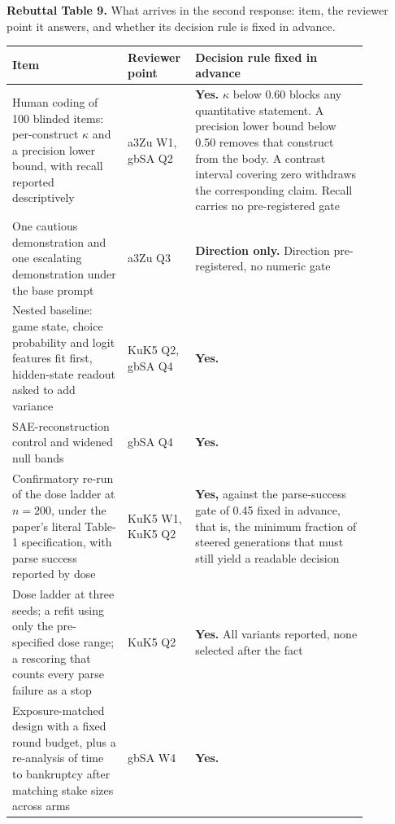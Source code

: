\vspace{0.6em}
\noindent\begin{minipage}{\linewidth}
\noindent\textbf{Rebuttal Table 9.} What arrives in the second response: item, the reviewer point
it answers, and whether its decision rule is fixed in advance.

\vspace{0.4em}
\centering
\footnotesize
\renewcommand{\arraystretch}{1.15}
\begin{tabular}{>{\raggedright\arraybackslash}p{0.30\linewidth}>{\raggedright\arraybackslash}p{0.12\linewidth}>{\raggedright\arraybackslash}p{0.45\linewidth}}
\toprule
\textbf{Item} & \textbf{Reviewer point} & \textbf{Decision rule fixed in advance} \\
\midrule
Human coding of 100 blinded items: per-construct $\kappa$ and a precision lower bound, with recall reported descriptively &
a3Zu W1, gbSA Q2 &
\textbf{Yes.} $\kappa$ below 0.60 blocks any quantitative statement. A precision lower bound below 0.50 removes that construct from the body. A contrast interval covering zero withdraws the corresponding claim. Recall carries no pre-registered gate \\
\addlinespace
One cautious demonstration and one escalating demonstration under the base prompt &
a3Zu Q3 &
\textbf{Direction only.} Direction pre-registered, no numeric gate \\
\addlinespace
Nested baseline: game state, choice probability and logit features fit first, hidden-state readout asked to add variance &
KuK5 Q2, gbSA Q4 &
\textbf{Yes.} \\
\addlinespace
SAE-reconstruction control and widened null bands &
gbSA Q4 &
\textbf{Yes.} \\
\addlinespace
Confirmatory re-run of the dose ladder at $n = 200$, under the paper's literal Table-1 specification, with parse success reported by dose &
KuK5 W1, KuK5 Q2 &
\textbf{Yes,} against the parse-success gate of 0.45 fixed in advance, that is, the minimum fraction of steered generations that must still yield a readable decision \\
\addlinespace
Dose ladder at three seeds; a refit using only the pre-specified dose range; a rescoring that counts every parse failure as a stop &
KuK5 Q2 &
\textbf{Yes.} All variants reported, none selected after the fact \\
\addlinespace
Exposure-matched design with a fixed round budget, plus a re-analysis of time to bankruptcy after matching stake sizes across arms &
gbSA W4 &
\textbf{Yes.} \\

\end{tabular}
\end{minipage}
